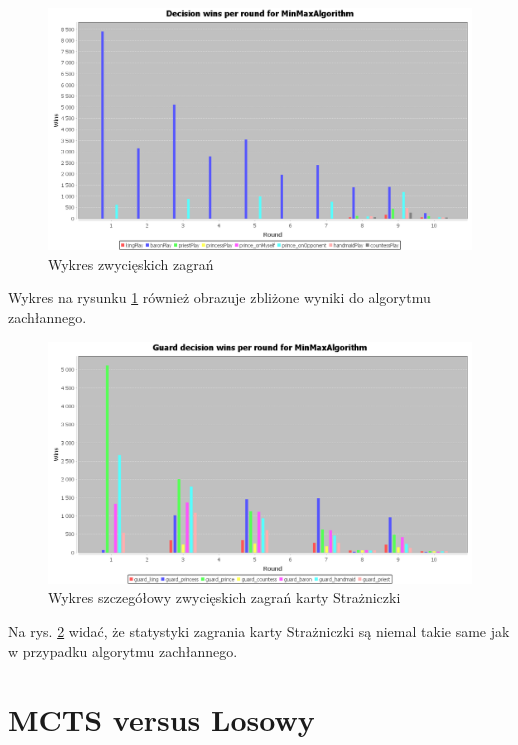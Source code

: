 \begin{figure}[H]
	\centering
	\includegraphics[width=\textwidth]{Resources/MmVsR/MmVsRdecision.PNG}
	\caption{Wykres zwycięskich zagrań} 
	\label{fig:MmVsRdecision}
\end{figure} 

Wykres na rysunku \ref{fig:MmVsRdecision} również obrazuje zbliżone wyniki do algorytmu zachłannego.

\begin{figure}[H]
	\centering
	\includegraphics[width=\textwidth]{Resources/MmVsR/MmVsRguarddecision.PNG}
	\caption{Wykres szczegółowy zwycięskich zagrań karty Strażniczki} 
	\label{fig:MmVsRguarddecision}
\end{figure}

Na rys. \ref{fig:MmVsRguarddecision} widać, że statystyki zagrania karty Strażniczki są niemal takie same jak w przypadku algorytmu zachłannego.

\section{MCTS versus Losowy}


